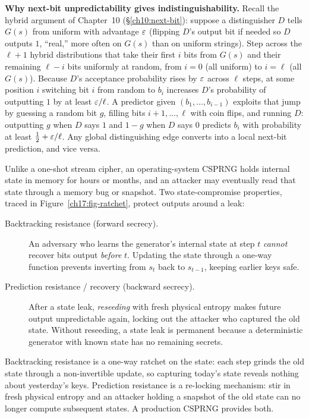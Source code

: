 \begin{whybox}
\textbf{Why next-bit unpredictability gives indistinguishability.} Recall the hybrid argument of Chapter~10 (\S\ref{ch10:next-bit}): suppose a distinguisher $D$ tells $G(s)$ from uniform with advantage $\varepsilon$ (flipping $D$'s output bit if needed so $D$ outputs $1$, ``real,'' more often on $G(s)$ than on uniform strings). Step across the $\ell + 1$ hybrid distributions that take their first $i$ bits from $G(s)$ and their remaining $\ell - i$ bits uniformly at random, from $i = 0$ (all uniform) to $i = \ell$ (all $G(s)$). Because $D$'s acceptance probability rises by $\varepsilon$ across $\ell$ steps, at some position $i$ switching bit $i$ from random to $b_i$ increases $D$'s probability of outputting $1$ by at least $\varepsilon/\ell$. A predictor given $(b_1, \dots, b_{i-1})$ exploits that jump by guessing a random bit $g$, filling bits $i+1, \dots, \ell$ with coin flips, and running $D$: outputting $g$ when $D$ says $1$ and $1 - g$ when $D$ says $0$ predicts $b_i$ with probability at least $\tfrac12 + \varepsilon/\ell$. Any global distinguishing edge converts into a local next-bit prediction, and vice versa.
\end{whybox}

Unlike a one-shot stream cipher, an operating-system CSPRNG holds internal state in memory for hours or months, and an attacker may eventually read that state through a memory bug or snapshot. Two state-compromise properties, traced in Figure~\ref{ch17:fig-ratchet}, protect outputs around a leak:

\begin{description}
  \item[Backtracking resistance (forward secrecy).] An adversary who learns the generator's internal state at step $t$ \emph{cannot} recover bits output \emph{before} $t$. Updating the state through a one-way function prevents inverting from $s_t$ back to $s_{t-1}$, keeping earlier keys safe.
  \item[Prediction resistance / recovery (backward secrecy).] After a state leak, \emph{reseeding} with fresh physical entropy makes future output unpredictable again, locking out the attacker who captured the old state. Without reseeding, a state leak is permanent because a deterministic generator with known state has no remaining secrets.
\end{description}

\begin{intuitionbox}
Backtracking resistance is a one-way ratchet on the state: each step grinds the old state through a non-invertible update, so capturing today's state reveals nothing about yesterday's keys. Prediction resistance is a re-locking mechanism: stir in fresh physical entropy and an attacker holding a snapshot of the old state can no longer compute subsequent states. A production CSPRNG provides both.
\end{intuitionbox}

